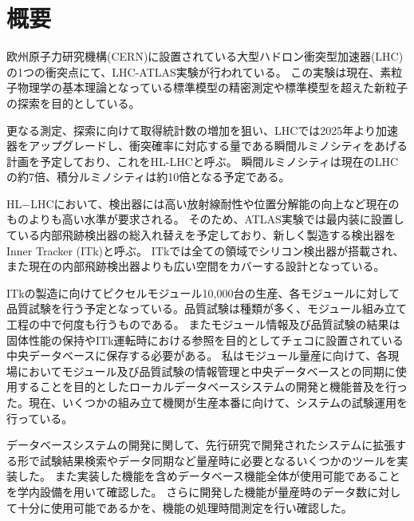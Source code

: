 \chapter*{概要}

欧州原子力研究機構(CERN)に設置されている大型ハドロン衝突型加速器(LHC)の1つの衝突点にて、LHC-ATLAS実験が行われている。
この実験は現在、素粒子物理学の基本理論となっている標準模型の精密測定や標準模型を超えた新粒子の探索を目的としている。

更なる測定、探索に向けて取得統計数の増加を狙い、LHCでは2025年より加速器をアップグレードし、衝突確率に対応する量である瞬間ルミノシティをあげる計画を予定しており、これをHL-LHCと呼ぶ。
瞬間ルミノシティは現在のLHCの約7倍、積分ルミノシティは約10倍となる予定である。

HL$-$LHCにおいて、検出器には高い放射線耐性や位置分解能の向上など現在のものよりも高い水準が要求される。
そのため、ATLAS実験では最内装に設置している内部飛跡検出器の総入れ替えを予定しており、新しく製造する検出器をInner Tracker (ITk)と呼ぶ。
ITkでは全ての領域でシリコン検出器が搭載され、また現在の内部飛跡検出器よりも広い空間をカバーする設計となっている。

ITkの製造に向けてピクセルモジュール10,000台の生産、各モジュールに対して品質試験を行う予定となっている。品質試験は種類が多く、モジュール組み立て工程の中で何度も行うものである。
またモジュール情報及び品質試験の結果は固体性能の保持やITk運転時における参照を目的としてチェコに設置されている中央データベースに保存する必要がある。
私はモジュール量産に向けて、各現場においてモジュール及び品質試験の情報管理と中央データベースとの同期に使用することを目的としたローカルデータベースシステムの開発と機能普及を行った。現在、いくつかの組み立て機関が生産本番に向けて、システムの試験運用を行っている。

データベースシステムの開発に関して、先行研究で開発されたシステムに拡張する形で試験結果検索やデータ同期など量産時に必要となるいくつかのツールを実装した。
また実装した機能を含めデータベース機能全体が使用可能であることを学内設備を用いて確認した。
さらに開発した機能が量産時のデータ数に対して十分に使用可能であるかを、機能の処理時間測定を行い確認した。


